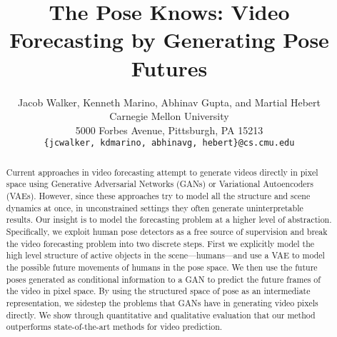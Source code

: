 \documentclass[10pt,twocolumn,letterpaper]{article}
\begin{document}
\title{The Pose Knows: Video Forecasting by Generating Pose Futures}

\author{Jacob Walker, Kenneth Marino, Abhinav Gupta, and Martial Hebert\\
Carnegie Mellon University\\
5000 Forbes Avenue, Pittsburgh, PA 15213\\
{\tt\small \{jcwalker, kdmarino, abhinavg, hebert\}@cs.cmu.edu}}
\maketitle


\begin{abstract}
    Current approaches in video forecasting attempt to generate videos directly in pixel space using Generative Adversarial Networks (GANs) or Variational Autoencoders (VAEs). However, since these approaches try to model all the structure and scene dynamics at once, in unconstrained settings they often generate uninterpretable results. Our insight is to model the forecasting problem at a higher level of abstraction. Specifically, we exploit human pose detectors as a free source of supervision and break the video forecasting problem into two discrete steps. First we explicitly model the high level structure of active objects in the scene---humans---and use a VAE to model the possible future movements of humans in the pose space. We then use the future poses generated as conditional information to a GAN to predict the future frames of the video in pixel space. By using the structured space of pose as an intermediate representation, we sidestep the problems that GANs have in generating video pixels directly. We show through quantitative and qualitative evaluation that our method outperforms state-of-the-art methods for video prediction.
    
    

\end{abstract}
\end{document}
